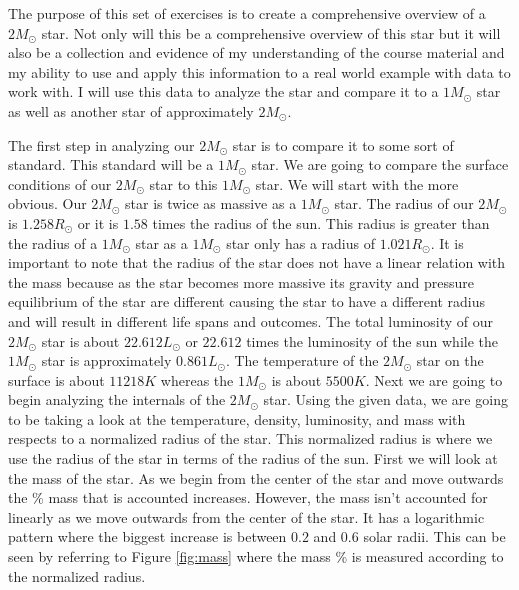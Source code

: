 \documentclass{article}
\begin{document}
The purpose of this set of exercises is to create a comprehensive overview of a $2M_\odot$ star. Not only will this be a comprehensive overview of this star but it will also be a collection and evidence of my understanding of the course material and my ability to use and apply this information to a real world example with data to work with. I will use this data to analyze the star and compare it to a $1M_\odot$ star as well as another star of approximately $2M_\odot$.\\

\pagebreak

\begin{multicols}{2}

The first step in analyzing our $2M_\odot$ star is to compare it to some sort of standard. This standard will be a $1M_\odot$ star. We are going to compare the surface conditions of our $2M_\odot$ star to this $1M_\odot$ star. We will start with the more obvious. Our $2M_\odot$ star is twice as massive as a $1M_\odot$ star. The radius of our $2M_\odot$ is $1.258R_\odot$ or it is $1.58$ times the radius of the sun. This radius is greater than the radius of a $1M_\odot$ star as a $1M_\odot$ star only has a radius of $1.021R_\odot$. It is important to note that the radius of the star does not have a linear relation with the mass because as the star becomes more massive its gravity and pressure equilibrium of the star are different causing the star to have a different radius and will result in different life spans and outcomes. The total luminosity of our $2M_\odot$ star is about $22.612L_\odot$ or $22.612$ times the luminosity of the sun while the $1M_\odot$ star is approximately $0.861L_\odot$. The temperature of the $2M_\odot$ star on the surface is about $11218K$ whereas the $1M_\odot$ is about $5500K$. Next we are going to begin analyzing the internals of the $2M_\odot$ star. Using the given data, we are going to be taking a look at the temperature, density, luminosity, and mass with respects to a normalized radius of the star. This normalized radius is where we use the radius of the star in terms of the radius of the sun. First we will look at the mass of the star. As we begin from the center of the star and move outwards the \% mass that is accounted increases. However, the mass isn't accounted for linearly as we move outwards from the center of the star. It has a logarithmic pattern where the biggest increase is between $0.2$ and $0.6$ solar radii. This can be seen by referring to Figure \ref{fig:mass} where the mass \% is measured according to the normalized radius.\\

\end{multicols}
\end{document}
